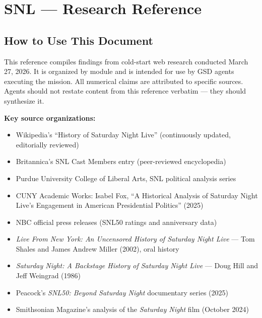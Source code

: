\documentclass[11pt,letterpaper]{article}
\newcommand{\stageheader}[2]{%
  \noindent\colorbox{#2}{\makebox[\textwidth][l]{%
    \textcolor{white}{\bfseries\sffamily\large\hspace{6pt}#1\hspace{6pt}}}}%
  \vspace{0.5em}\par%
}
\begin{document}
\newpage

\stageheader{STAGE 2 --- RESEARCH REFERENCE}{secondary}

\section{SNL --- Research Reference}

\subsection{How to Use This Document}

This reference compiles findings from cold-start web research conducted March 27, 2026. It is organized by module and is intended for use by GSD agents executing the mission. All numerical claims are attributed to specific sources. Agents should not restate content from this reference verbatim --- they should synthesize it.

\textbf{Key source organizations:}
\begin{itemize}[noitemsep]
  \item Wikipedia's ``History of Saturday Night Live'' (continuously updated, editorially reviewed)
  \item Britannica's SNL Cast Members entry (peer-reviewed encyclopedia)
  \item Purdue University College of Liberal Arts, SNL political analysis series
  \item CUNY Academic Works: Isabel Fox, ``A Historical Analysis of Saturday Night Live's Engagement in American Presidential Politics'' (2025)
  \item NBC official press releases (SNL50 ratings and anniversary data)
  \item \textit{Live From New York: An Uncensored History of Saturday Night Live} --- Tom Shales and James Andrew Miller (2002), oral history
  \item \textit{Saturday Night: A Backstage History of Saturday Night Live} --- Doug Hill and Jeff Weingrad (1986)
  \item Peacock's \textit{SNL50: Beyond Saturday Night} documentary series (2025)
  \item Smithsonian Magazine's analysis of the \textit{Saturday Night} film (October 2024)
\end{itemize}
\end{document}
